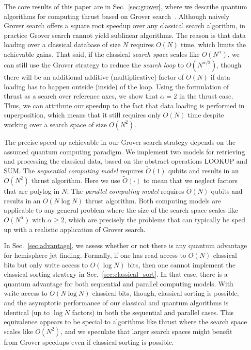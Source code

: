 \documentclass[aps,prd,twocolumn,superscriptaddress,preprintnumbers,nofootinbib,longbibliography,floatfix]{revtex4-1}
\DeclareRobustCommand{\Sec}[1]{Sec.~\ref{#1}}
\begin{document}
The core results of this paper are in \Sec{sec:grover}, where we describe quantum algorithms for computing thrust based on Grover search~\cite{Grover:1996:FQM:237814.237866}.
%
Although naively Grover search offers a square root speedup over any classical search algorithm, in practice Grover search cannot yield sublinear algorithms.
%
The reason is that data loading over a classical database of size $N$ requires $O(N)$ time, which limits the achievable gains.
%
That said, if the classical \emph{search space} scales like $O(N^\alpha)$, we can still use the Grover strategy to reduce the \emph{search loop} to $O(N^{\alpha/2})$, though there will be an additional additive (multiplicative) factor of $O(N)$ if data loading has to happen outside (inside) of the loop.
%
Using the formulation of thrust as a search over reference axes, we show that $\alpha=2$ in the thrust case.
%
Thus, we can attribute our speedup to the fact that data loading is performed in superposition, which means that it still requires only $O(N)$ time despite working over a search space of size $O(N^2)$.



The precise speed up achievable in our Grover search strategy depends on the assumed quantum computing paradigm.
%
We implement two models for retrieving and processing the classical data, based on the abstract operations LOOKUP and SUM.
%
The \emph{sequential computing model} requires $\widetilde{O}(1)$ qubits and results in an $O(N^2)$ thrust algorithm.
%
Here we use $\widetilde{O}(\cdot)$ to mean that we neglect factors that are polylog in $N$.
%
The \emph{parallel computing model} requires $\widetilde{O}(N)$ qubits and results in an $O(N\log N)$ thrust algorithm.
%
Both computing models are applicable to any general problem where the size of the search space scales like $O(N^\alpha)$ with $\alpha\geq 2$, which are precisely the problems that can typically be sped up with a realistic application of Grover search. 


In \Sec{sec:advantage}, we assess whether or not there is any quantum advantage for hemisphere jet finding.
%
Formally, if one has read access to $O(N)$ classical bits but only write access to $O(\log N)$ bits, then one cannot implement the classical sorting strategy in \Sec{sec:classical_sort}.
%
In that case, there is a quantum advantage for both sequential and parallel computing models.
%
With write access to $O(N \log N)$ classical bits, though, classical sorting is possible, and the asymptotic performance of our classical and quantum algorithms is identical (up to $\log N$ factors) in both the sequential and parallel cases.
%
This equivalence appears to be special to algorithms like thrust where the search space scales like $O(N^2)$, and we speculate that larger search spaces might benefit from Grover speedups even if classical sorting is possible.
\end{document}
